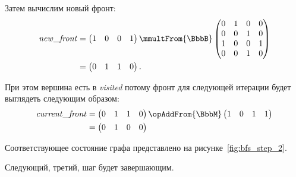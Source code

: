 \begin{example}
    Затем вычислим новый фронт:
    \begin{align*}
        \mathit{new\_front} & =
        \begin{pmatrix}
            1 & 0 & 0 & 1
        \end{pmatrix} \mmultFrom{\BbbB}
        \begin{pmatrix}
            0 & 1 & 0 & 0 \\
            0 & 0 & 1 & 0 \\
            1 & 0 & 0 & 1 \\
            0 & 0 & 1 & 0
        \end{pmatrix}        \\ &=
        \begin{pmatrix}
            0 & 1 & 1 & 0
        \end{pmatrix}.
    \end{align*}

    При этом вершина  есть в \emph{visited} потому фронт для следующей итерации будет выглядеть следующим образом:
    \begin{align*}
        \mathit{current\_front} & =
        \begin{pmatrix}
            0 & 1 & 1 & 0
        \end{pmatrix} \opAddFrom{\BbbM}
        \begin{pmatrix}
            1 & 0 & 1 & 1
        \end{pmatrix}            \\ &=
        \begin{pmatrix}
            0 & 1 & 0 & 0
        \end{pmatrix}
    \end{align*}

    \begin{marginfigure}
        \begin{center}
            \resizebox{\marginparwidth}{!}{}
        \end{center}
        \caption{Обход в ширину, шаг второй}
        \label{fig:bfs_step_2}
    \end{marginfigure}

    Соответствующее состояние графа представлено на рисунке~\ref{fig:bfs_step_2}.

    Следующий, третий, шаг будет завершающим.


\end{example}
